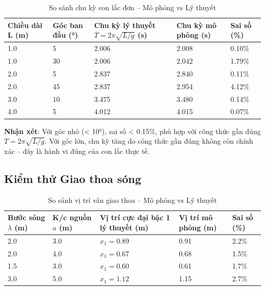 \begin{table}[H]
\centering
\caption{So sánh chu kỳ con lắc đơn – Mô phỏng vs Lý thuyết}
\begin{tabular}{|p{}|p{}|p{}|p{}|p{}|}
\hline
\textbf{Chiều dài L (m)} & \textbf{Góc ban đầu (°)} & \textbf{Chu kỳ lý thuyết $T = 2\pi\sqrt{L/g}$ (s)} & \textbf{Chu kỳ mô phỏng (s)} & \textbf{Sai số (\%)} \\
\hline
1.0 & 5 & 2.006 & 2.008 & 0.10\% \\
\hline
1.0 & 30 & 2.006 & 2.042 & 1.79\% \\
\hline
2.0 & 5 & 2.837 & 2.840 & 0.11\% \\
\hline
2.0 & 45 & 2.837 & 2.954 & 4.12\% \\
\hline
3.0 & 10 & 3.475 & 3.480 & 0.14\% \\
\hline
4.0 & 5 & 4.012 & 4.015 & 0.07\% \\
\hline
\end{tabular}
\end{table}

\textbf{Nhận xét}: Với góc nhỏ (< 10°), sai số < 0.15\%, phù hợp với công thức gần đúng $T = 2\pi\sqrt{L/g}$. Với góc lớn, chu kỳ tăng do công thức gần đúng không còn chính xác – đây là hành vi đúng của con lắc thực tế.

\subsection{Kiểm thử Giao thoa sóng}

\begin{table}[H]
\centering
\caption{So sánh vị trí vân giao thoa – Mô phỏng vs Lý thuyết}
\begin{tabular}{|p{}|p{}|p{}|p{}|p{}|}
\hline
\textbf{Bước sóng $\lambda$ (m)} & \textbf{K/c nguồn $a$ (m)} & \textbf{Vị trí cực đại bậc 1 lý thuyết (m)} & \textbf{Vị trí mô phỏng (m)} & \textbf{Sai số (\%)} \\
\hline
2.0 & 3.0 & $x_1 = 0.89$ & 0.91 & 2.2\% \\
\hline
2.0 & 4.0 & $x_1 = 0.67$ & 0.68 & 1.5\% \\
\hline
1.5 & 3.0 & $x_1 = 0.60$ & 0.61 & 1.7\% \\
\hline
3.0 & 5.0 & $x_1 = 1.12$ & 1.15 & 2.7\% \\
\hline
\end{tabular}
\end{table}

